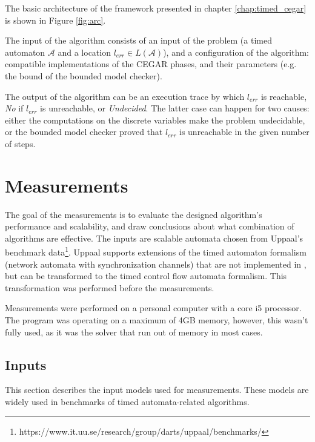 The basic architecture of the framework presented in chapter \ref{chap:timed_cegar} is shown in Figure \ref{fig:arc}.

The input of the algorithm consists of an input of the problem (a timed automaton $\mathcal{A}$ and a location $l_{err} \in L(\mathcal{A})$), and a configuration of the algorithm: compatible implementations of the CEGAR phases, and their parameters (e.g. the bound of the bounded model checker).

The output of the algorithm can be an execution trace by which $l_{err}$ is reachable, \emph{No} if $l_{err}$ is unreachable, or \emph{Undecided}. The latter case can happen for two causes: either the computations on the discrete variables make the problem undecidable, or the bounded model checker proved that $l_{err}$ is unreachable in the given number of steps. 



\section{Measurements}

The goal of the measurements is to evaluate the designed algorithm's performance and scalability, and draw conclusions about what combination of algorithms are effective. The inputs are scalable automata chosen from Uppaal's benchmark data\footnote{https://www.it.uu.se/research/group/darts/uppaal/benchmarks/}. Uppaal supports extensions of the timed automaton formalism (network automata with synchronization channels) that are not implemented in \ttmc, but can be transformed to the timed control flow automata formalism. This transformation was performed before the measurements.

Measurements were performed on a personal computer with a core i5 processor. The program was operating on a maximum of 4GB memory, however, this wasn't fully used, as it was the solver that run out of memory in most cases.


\subsection{Inputs}

This section describes the input models used for measurements. These models are widely used in benchmarks of timed automata-related algorithms.

